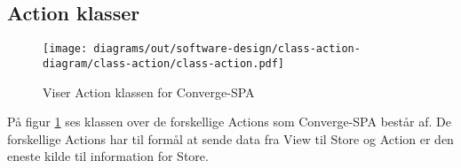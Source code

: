 \subsection{Action klasser}

\begin{figure}[H]
    \centering
\texttt{[image: diagrams/out/software-design/class-action-diagram/class-action/class-action.pdf]}
\caption{Viser Action klassen for Converge-SPA}
\label{fig:action}
\end{figure}

På figur \ref{fig:action} ses klassen over de forskellige Actions som Converge-SPA består af. De forskellige Actions har til formål at sende data fra View til Store og Action er den eneste kilde til information for Store. 
